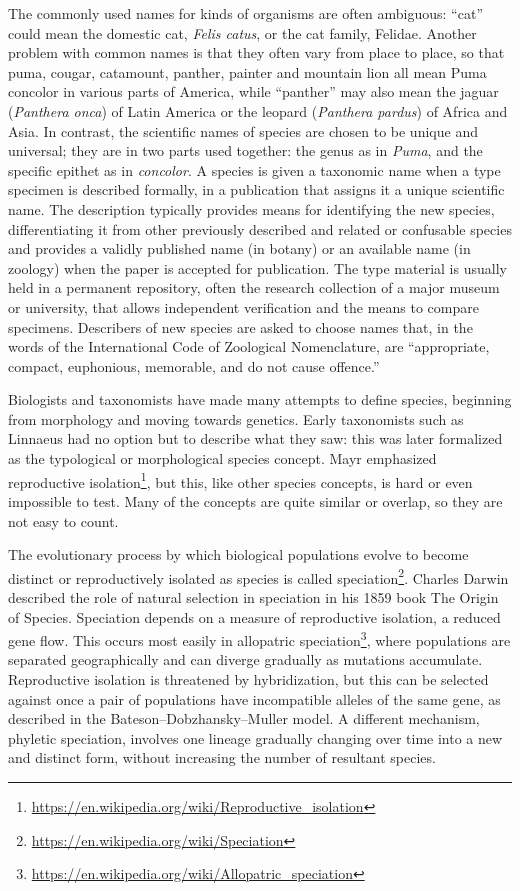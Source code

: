 \documentclass[]{book}
\let\rmarkdownfootnote\footnote%
\def\footnote{\protect\rmarkdownfootnote}
\renewcommand{\href}[2]{#2\footnote{\url{#1}}}
\begin{document}
The commonly used names for kinds of organisms are often ambiguous: ``cat'' could mean the domestic cat, \emph{Felis catus}, or the cat family, Felidae. Another problem with common names is that they often vary from place to place, so that puma, cougar, catamount, panther, painter and mountain lion all mean Puma concolor in various parts of America, while ``panther'' may also mean the jaguar (\emph{Panthera onca}) of Latin America or the leopard (\emph{Panthera pardus}) of Africa and Asia. In contrast, the scientific names of species are chosen to be unique and universal; they are in two parts used together: the genus as in \emph{Puma}, and the specific epithet as in \emph{concolor}.
A species is given a taxonomic name when a type specimen is described formally, in a publication that assigns it a unique scientific name. The description typically provides means for identifying the new species, differentiating it from other previously described and related or confusable species and provides a validly published name (in botany) or an available name (in zoology) when the paper is accepted for publication. The type material is usually held in a permanent repository, often the research collection of a major museum or university, that allows independent verification and the means to compare specimens. Describers of new species are asked to choose names that, in the words of the International Code of Zoological Nomenclature, are ``appropriate, compact, euphonious, memorable, and do not cause offence.''

Biologists and taxonomists have made many attempts to define species, beginning from morphology and moving towards genetics. Early taxonomists such as Linnaeus had no option but to describe what they saw: this was later formalized as the typological or morphological species concept. Mayr emphasized \href{https://en.wikipedia.org/wiki/Reproductive_isolation}{reproductive isolation}, but this, like other species concepts, is hard or even impossible to test. Many of the concepts are quite similar or overlap, so they are not easy to count.

The evolutionary process by which biological populations evolve to become distinct or reproductively isolated as species is called \href{https://en.wikipedia.org/wiki/Speciation}{speciation}. Charles Darwin described the role of natural selection in speciation in his 1859 book The Origin of Species. Speciation depends on a measure of reproductive isolation, a reduced gene flow. This occurs most easily in \href{https://en.wikipedia.org/wiki/Allopatric_speciation}{allopatric speciation}, where populations are separated geographically and can diverge gradually as mutations accumulate. Reproductive isolation is threatened by hybridization, but this can be selected against once a pair of populations have incompatible alleles of the same gene, as described in the Bateson--Dobzhansky--Muller model. A different mechanism, phyletic speciation, involves one lineage gradually changing over time into a new and distinct form, without increasing the number of resultant species.
\end{document}
